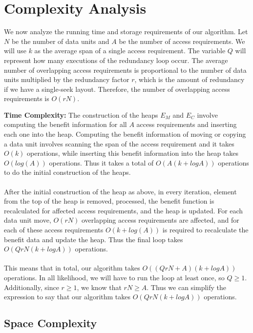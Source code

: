 \section{Complexity Analysis}

We now analyze the running time and storage requirements of our algorithm. Let $N$ be the number of data units and $A$ be the number of access requirements. We will use $k$ as the average span of a single access requirement. The variable $Q$ will represent how many executions of the redundancy loop occur. The average number of overlapping access requirements is proportional  to the number of data units multiplied by the redundancy factor $r$, which is the amount of redundancy if we have a single-seek layout. Therefore, the number of overlapping access requirements is $O(rN)$. 

{\bf Time Complexity:} The construction of the heaps $E_M$ and $E_C$ involve computing the benefit information for all $A$ access requirements and inserting each one into the heap. Computing the benefit information of moving or copying a data unit involves scanning the span of the access requirement and it takes $O(k)$ operations, while inserting this benefit information into the heap takes $O(log (A))$ operations. Thus it takes a total of $O(A (k + logA))$ operations to do the initial construction of the heaps. \\
\\
After the initial construction of the heap as above, in every iteration, element from the top of the heap is removed, processed, the benefit function is recalculated for affected access requirements, and the heap is updated. For each data unit move, $O(rN)$ overlapping access requirements are affected, and for each of these access requirements $O(k+log(A))$ is required to recalculate the benefit data and update the heap. Thus the final loop takes $O(QrN(k + logA))$ operations. \\
\\
This means that in total, our algorithm takes $O((QrN + A)(k + logA))$ operations. In all likelihood, we will have to run the loop at least once, so $Q \geq 1$. Additionally, since $r \geq 1$, we know that $rN \geq A$. Thus we can simplify the expression to say that our algorithm takes $O(QrN(k + logA))$ operations. 

\subsection{Space Complexity}

